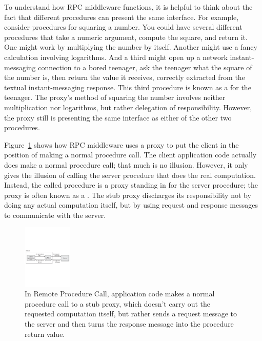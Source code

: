 To understand how RPC middleware functions, it is helpful to
think about the fact that different procedures can present the same
interface.  For example, consider procedures for squaring a number.
You could have several different procedures that take a numeric
argument, compute the square, and return it.  One might work by
multiplying the number by itself.  Another might use a fancy
calculation involving logarithms.  And a third might open up a network
instant-messaging connection to a bored teenager, ask the teenager
what the square of the number is, then return the value it receives,
correctly extracted from the textual instant-messaging response.  This
third procedure is known as a  for the teenager.  The
proxy's method of squaring the number involves neither multiplication
nor logarithms, but rather delegation of responsibility.  However, the
proxy still is presenting the same interface as either of the other
two procedures.

Figure~\ref{scan-10-3} shows how RPC middleware uses a proxy to
put the client in the position of making a normal procedure call.  The
client application code actually does make a normal procedure call;
that much is no illusion.  However, it only gives the illusion of
calling the server procedure that does the real computation.  Instead,
the called procedure is a proxy standing in for the server procedure;
the proxy is often known as a .  The stub proxy discharges
its responsibility not by doing any actual computation itself, but by
using request and response messages to communicate with the server.
\begin{figure}
\centerline{\includegraphics[height=1.2in]{hail_f1003}}
\caption{In Remote Procedure Call, application code makes a normal
  procedure call to a stub proxy, which doesn't carry out the
  requested computation itself, but rather sends a request message to
  the server and then turns the response message into the procedure
  return value.}
\label{scan-10-3}
\end{figure}

